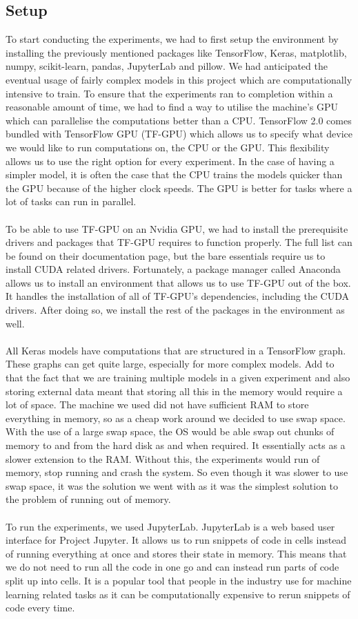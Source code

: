\documentclass[12pt]{article}
\begin{document}
\subsection{Setup}
To start conducting the experiments, we had to first setup the environment by installing the previously mentioned packages like TensorFlow, Keras, matplotlib, numpy, scikit-learn, pandas, JupyterLab and pillow. We had anticipated the eventual usage of fairly complex models in this project which are computationally intensive to train. To ensure that the experiments ran to completion within a reasonable amount of time, we had to find a way to utilise the machine's GPU which can parallelise the computations better than a CPU. TensorFlow 2.0 comes bundled with TensorFlow GPU (TF-GPU) which allows us to specify what device we would like to run computations on, the CPU or the GPU. This flexibility allows us to use the right option for every experiment. In the case of having a simpler model, it is often the case that the CPU trains the models quicker than the GPU because of the higher clock speeds. The GPU is better for tasks where a lot of tasks can run in parallel. 
\\\\
To be able to use TF-GPU on an Nvidia GPU, we had to install the prerequisite drivers and packages that TF-GPU requires to function properly. The full list can be found on their documentation page, but the bare essentials require us to install CUDA related drivers. Fortunately, a package manager called Anaconda allows us to install an environment that allows us to use TF-GPU out of the box. It handles the installation of all of TF-GPU's dependencies, including the CUDA drivers. After doing so, we install the rest of the packages in the environment as well.
\\\\
All Keras models have computations that are structured in a TensorFlow graph. These graphs can get quite large, especially for more complex models. Add to that the fact that we are training multiple models in a given experiment and also storing external data meant that storing all this in the memory would require a lot of space. The machine we used did not have sufficient RAM to store everything in memory, so as a cheap work around we decided to use swap space. With the use of a large swap space, the OS would be able swap out chunks of memory to and from the hard disk as and when required. It essentially acts as a slower extension to the RAM. Without this, the experiments would run of memory, stop running and crash the system. So even though it was slower to use swap space, it was the solution we went with as it was the simplest solution to the problem of running out of memory. 
\\\\
To run the experiments, we used JupyterLab. JupyterLab is a web based user interface for Project Jupyter. It allows us to run snippets of code in cells instead of running everything at once and stores their state in memory. This means that we do not need to run all the code in one go and can instead run parts of code split up into cells. It is a popular tool that people in the industry use for machine learning related tasks as it can be computationally expensive to rerun snippets of code every time. 
\end{document}
